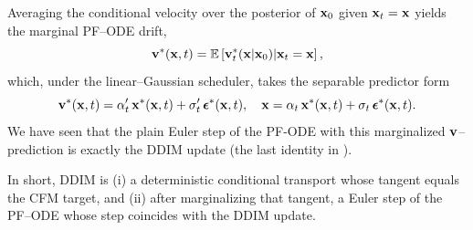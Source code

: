 Averaging the conditional velocity over the posterior of ${\mathbf{x}}_0$ given ${\mathbf{x}}_t={\mathbf{x}}$ yields the marginal PF–ODE drift,
\[
{\mathbf{v}}^*({\mathbf{x}},t)=\mathbb{E} \left[{\mathbf{v}}_t^*({\mathbf{x}}| {\mathbf{x}}_0)|{\mathbf{x}}_t={\mathbf{x}}\right],
\]
which, under the linear–Gaussian scheduler, takes the separable predictor form
\[
{\mathbf{v}}^*({\mathbf{x}},t)=\alpha_t'\,{\mathbf{x}}^*({\mathbf{x}},t)+\sigma_t'\,{\bm{\epsilon}}^*({\mathbf{x}},t),
\quad
{\mathbf{x}}=\alpha_t\,{\mathbf{x}}^*({\mathbf{x}},t)+\sigma_t\,{\bm{\epsilon}}^*({\mathbf{x}},t).
\]
We have seen that the plain Euler step of the PF-ODE with this marginalized ${\mathbf{v}}$–prediction is exactly the DDIM  update (the last identity in ).

In short, DDIM is (i) a deterministic conditional transport whose tangent equals the CFM target, and (ii) after marginalizing that tangent, a Euler step of the PF–ODE whose step coincides with the DDIM update.


\newpage





